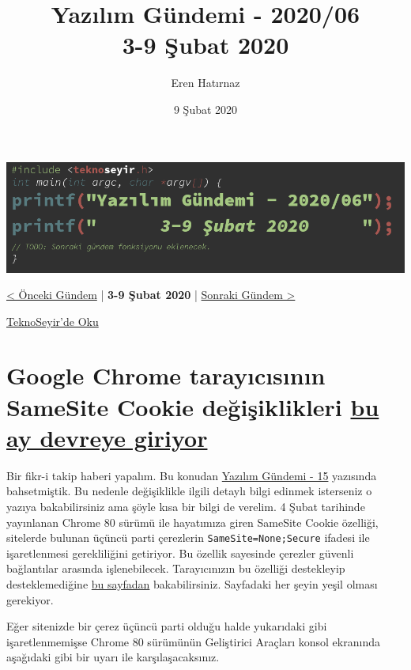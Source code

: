 \documentclass[11pt]{article}
\author{Eren Hatırnaz}
\date{9 Şubat 2020}
\title{Yazılım Gündemi - 2020/06\\\medskip
\large 3-9 Şubat 2020}
\begin{document}
\maketitle
\tableofcontents \clearpage\shorthandoff{=}

\begin{center}
\includegraphics[width=.9\linewidth]{gorseller/yazilim-gundemi-banner.png}
\end{center}

\begin{center}
\href{../05/yazilim-gundemi-2020-05.pdf}{< Önceki Gündem} | \textbf{3-9 Şubat 2020} | \href{../07/yazilim-gundemi-2020-07.pdf}{Sonraki Gündem >}

\href{https://teknoseyir.com/blog/yazilim-gundemi-2020-06}{TeknoSeyir'de Oku}
\end{center}

\section{Google Chrome tarayıcısının SameSite Cookie değişiklikleri \href{https://blog.chromium.org/2020/02/samesite-cookie-changes-in-february.html}{bu ay devreye giriyor}}
\label{sec:org530a45e}
Bir fikr-i takip haberi yapalım. Bu konudan \href{../../2019/15/yazilim-gundemi-15.pdf}{Yazılım Gündemi - 15} yazısında
bahsetmiştik. Bu nedenle değişiklikle ilgili detaylı bilgi edinmek isterseniz
o yazıya bakabilirsiniz ama şöyle kısa bir bilgi de verelim. 4 Şubat tarihinde
yayınlanan Chrome 80 sürümü ile hayatımıza giren SameSite Cookie özelliği,
sitelerde bulunan üçüncü parti çerezlerin \texttt{SameSite=None;Secure} ifadesi ile
işaretlenmesi gerekliliğini getiriyor. Bu özellik sayesinde çerezler güvenli
bağlantılar arasında işlenebilecek. Tarayıcınızın bu özelliği destekleyip
desteklemediğine \href{https://samesite-sandbox.glitch.me/}{bu sayfadan} bakabilirsiniz. Sayfadaki her şeyin yeşil olması
gerekiyor.

Eğer sitenizde bir çerez üçüncü parti olduğu halde yukarıdaki gibi
işaretlenmemişse Chrome 80 sürümünün Geliştirici Araçları konsol ekranında
aşağıdaki gibi bir uyarı ile karşılaşacaksınız.
\end{document}
